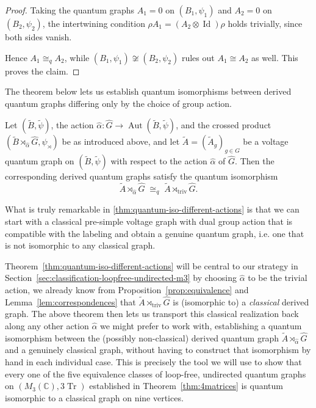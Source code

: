 \begin{proof}
    Taking the quantum graphs \( A_1 = 0 \) on \( (B_1,\psi_1) \) and
    \( A_2 = 0 \) on \( (B_2,\psi_2) \), the intertwining condition
    \( \rho A_1 = (A_2 \otimes \operatorname{Id}) \rho \) holds
    trivially, since both sides vanish.

    Hence \( A_1 \cong_q A_2 \), while
    \( (B_1,\psi_1) \not\cong (B_2,\psi_2) \) rules out
    \( A_1 \cong A_2 \) as well. This proves the claim.
\end{proof}

The theorem below lets us establish quantum isomorphisms between
derived quantum graphs differing only by the choice of group action.

\begin{theorem}
    \label{thm:quantum-iso-different-actions}
    Let \( (\widetilde{B}, \widetilde\psi) \), the action
    \( \widehat\alpha \colon \widehat{G} \to \operatorname{Aut}(\widetilde{B},
    \widetilde\psi) \),
    and the crossed product
    \( (\widetilde{B} \rtimes_{\widehat\alpha} \widehat{G},
    \psi_\rtimes) \) be as
    introduced above, and let \( \widetilde{A} = (\widetilde{A}_g)_{g \in G} \)
    be a voltage quantum graph on \( (\widetilde{B}, \widetilde\psi) \) with
    respect to the action \( \widehat\alpha \) of \( \widehat{G} \). Then the
    corresponding derived quantum graphs satisfy the quantum
    isomorphism
    \[
        \widetilde{A} \rtimes_{\widehat\alpha} \widehat{G}
        \;\cong_q\;
        \widetilde{A} \rtimes_{\mathrm{triv}} \widehat{G}.
    \]
\end{theorem}

What is truly remarkable in \ref{thm:quantum-iso-different-actions}
is that we can start with a classical pre-simple voltage graph with
dual group action that is compatible with the labeling and obtain a
genuine quantum graph, i.e. one that is not isomorphic to any classical graph.

Theorem~\ref{thm:quantum-iso-different-actions} will be central to our
strategy in Section~\ref{sec:classification-loopfree-undirected-m3}
by choosing \( \widehat\alpha \) to be
the trivial action, we already know from
Proposition~\ref{prop:equivalence} and
Lemma~\ref{lem:correspondences} that
\( \widetilde{A}\rtimes_{\mathrm{triv}}\widehat{G} \) is (isomorphic to) a
\emph{classical} derived graph. The above theorem then lets us transport
this classical realization back along any other action \( \widehat\alpha \)
we might prefer to work with, establishing a quantum isomorphism
between the (possibly non-classical) derived quantum graph
\( \widetilde{A}\rtimes_{\widehat\alpha}\widehat{G} \) and a genuinely classical
graph, without having to construct that isomorphism by hand in each
individual case. This is precisely the tool we will use to show that
every one of the five equivalence classes of loop-free, undirected
quantum graphs on \( (M_{3}(\mathbb{C}), 3\operatorname{Tr}) \) established in
Theorem~\ref{thm:4matrices} is quantum isomorphic to a classical
graph on nine vertices.

